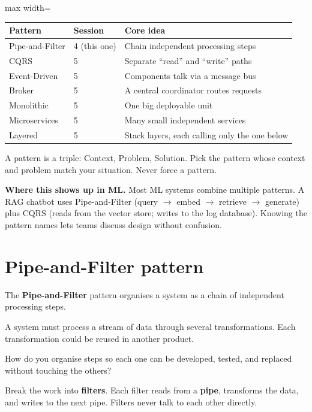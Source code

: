 \documentclass[a4paper,11pt]{article}
\newcommand{\vocab}[1]{\textbf{\color{navy}#1}}
\begin{document}
\begin{center}
\begin{adjustbox}{max width=\linewidth}
\begin{tabular}{llp{6.5cm}}
\toprule
\textbf{Pattern} & \textbf{Session} & \textbf{Core idea} \\
\midrule
Pipe-and-Filter & 4 (this one) & Chain independent processing steps \\
CQRS & 5 & Separate ``read'' and ``write'' paths \\
Event-Driven & 5 & Components talk via a message bus \\
Broker & 5 & A central coordinator routes requests \\
Monolithic & 5 & One big deployable unit \\
Microservices & 5 & Many small independent services \\
Layered & 5 & Stack layers, each calling only the one below \\
\bottomrule
\end{tabular}
\end{adjustbox}
\end{center}

\begin{keytake}
A pattern is a triple: Context, Problem, Solution. Pick the pattern
whose context and problem match your situation. Never force a pattern.
\end{keytake}

\noindent\textbf{Where this shows up in ML.}
Most ML systems combine multiple patterns. A RAG chatbot uses
Pipe-and-Filter (query $\to$ embed $\to$ retrieve $\to$ generate) plus
CQRS (reads from the vector store; writes to the log database).
Knowing the pattern names lets teams discuss design without confusion.

\section{Pipe-and-Filter pattern}

The \vocab{Pipe-and-Filter} pattern organises a system as a chain of
independent processing steps.

\begin{description}[leftmargin=5em]
  \item[\textbf{Context}] A system must process a stream of data through
        several transformations. Each transformation could be reused in
        another product.
  \item[\textbf{Problem}] How do you organise steps so each one can be
        developed, tested, and replaced without touching the others?
  \item[\textbf{Solution}] Break the work into \vocab{filters}. Each
        filter reads from a \vocab{pipe}, transforms the data, and
        writes to the next pipe. Filters never talk to each other directly.
\end{description}
\end{document}
